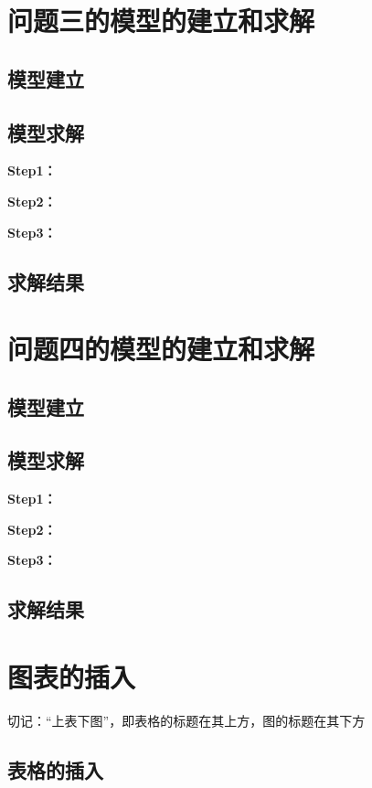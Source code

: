 \documentclass[withoutpreface,bwprint]{NoteBook}
\begin{document}

\section{问题三的模型的建立和求解}
\subsection{模型建立}


\subsection{模型求解}

\textbf{Step1：} 

\textbf{Step2：} 

\textbf{Step3：} 

\subsection{求解结果}


\section{问题四的模型的建立和求解}
\subsection{模型建立}

\subsection{模型求解}

\textbf{Step1：} 

\textbf{Step2：} 

\textbf{Step3：} 

\subsection{求解结果}



\section{图表的插入}
切记：“上表下图”，即表格的标题在其上方，图的标题在其下方
\subsection{表格的插入}
\end{document}
